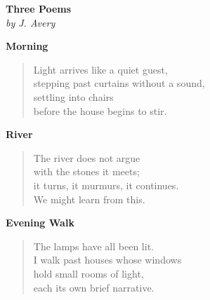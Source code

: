 \documentclass[12pt]{article}
\begin{document}
\begin{center}
  {\Large\bfseries Three Poems}\\[0.2cm]
  {\itshape by J. Avery}
\end{center}

\vspace{0.5cm}

\begin{center}
  \textbf{Morning}
\end{center}

\begin{verse}
Light arrives like a quiet guest, \\
stepping past curtains without a sound, \\
settling into chairs \\
before the house begins to stir.
\end{verse}

\vspace{0.5cm}

\begin{center}
  \textbf{River}
\end{center}

\begin{verse}
The river does not argue \\
with the stones it meets; \\
it turns, it murmurs, it continues. \\
We might learn from this.
\end{verse}

\vspace{0.5cm}

\begin{center}
  \textbf{Evening Walk}
\end{center}

\begin{verse}
The lamps have all been lit. \\
I walk past houses whose windows \\
hold small rooms of light, \\
each its own brief narrative.
\end{verse}
\end{document}
